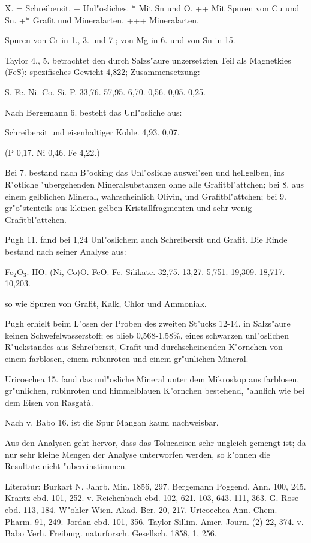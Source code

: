 \documentclass[a4paper, 11pt, oneside]{article}
\begin{document}
X. = Schreibersit.  
+ Unl"osliches.  
* Mit Sn und O.  
++ Mit Spuren von Cu und Sn.  
+* Grafit und Mineralarten.  
+++ Mineralarten.

Spuren von Cr in 1., 3. und 7.; von Mg in 6. und von Sn in 15.

Taylor 4., 5. betrachtet den durch Salzs"aure unzersetzten Teil als Magnetkies (FeS): spezifisches Gewicht 4,822; Zusammensetzung:

S. Fe. Ni. Co. Si. P.  
33,76. 57,95. 6,70. 0,56. 0,05. 0,25.

Nach Bergemann 6. besteht das Unl"osliche aus:

Schreibersit und eisenhaltiger Kohle.  
4,93. 0,07.

(P 0,17. Ni 0,46. Fe 4,22.)

Bei 7. bestand nach B"ocking das Unl"osliche auswei"sen und hellgelben, ins R"otliche "ubergehenden Mineralsubstanzen ohne alle Grafitbl"attchen; bei 8. aus einem gelblichen Mineral, wahrscheinlich Olivin, und Grafitbl"attchen; bei 9. gr"o"stenteils aus kleinen gelben Kristallfragmenten und sehr wenig Grafitbl"attchen.

Pugh 11. fand bei 1,24 Unl"oslichem auch Schreibersit und Grafit. Die Rinde bestand nach seiner Analyse aus:

Fe$_{2}$O$_{3}$. HO. (Ni, Co)O. FeO. Fe. Silikate.  
32,75. 13,27. 5,751. 19,309. 18,717. 10,203.

so wie Spuren von Grafit, Kalk, Chlor und Ammoniak.

Pugh erhielt beim L"osen der Proben des zweiten St"ucks 12-14. in Salzs"aure keinen Schwefelwasserstoff; es blieb 0,568-1,58\%, eines schwarzen unl"oslichen R"uckstandes aus Schreibersit, Grafit und durchscheinenden K"ornchen von einem farblosen, einem rubinroten und einem gr"unlichen Mineral.

Uricoechea 15. fand das unl"osliche Mineral unter dem Mikroskop aus farblosen, gr"unlichen, rubinroten und himmelblauen K"ornchen bestehend, "ahnlich wie bei dem Eisen von Rasgatà.

Nach v. Babo 16. ist die Spur Mangan kaum nachweisbar.

Aus den Analysen geht hervor, dass das Tolucaeisen sehr ungleich gemengt ist; da nur sehr kleine Mengen der Analyse unterworfen werden, so k"onnen die Resultate nicht "ubereinstimmen.

Literatur: Burkart N. Jahrb. Min. 1856, 297. Bergemann Poggend. Ann. 100, 245. Krantz ebd. 101, 252. v. Reichenbach ebd. 102, 621. 103, 643. 111, 363. G. Rose ebd. 113, 184. W"ohler Wien. Akad. Ber. 20, 217. Uricoechea Ann. Chem. Pharm. 91, 249. Jordan ebd. 101, 356. Taylor Sillim. Amer. Journ. (2) 22, 374. v. Babo Verh. Freiburg. naturforsch. Gesellsch. 1858, 1, 256.
\end{document}
